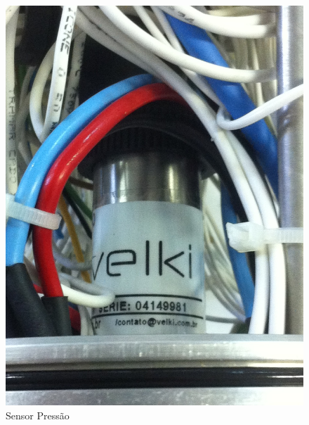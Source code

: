 \begin{figure}[h!]
 \centering
 \includegraphics[width=1\columnwidth]{Pressao/foto}
 \caption{Sensor Pressão}
\end{figure}